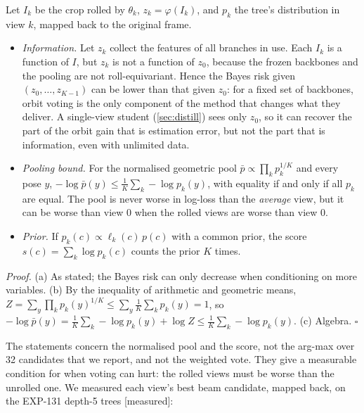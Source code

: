 \begin{proposition}\label{prop:orbit}
Let $I_k$ be the crop rolled by $\theta_k$, $z_k=\varphi(I_k)$, and $p_k$ the tree's distribution in view $k$, mapped back to the
original frame.
\begin{itemize}
\item[(a)] \emph{Information.} Let $z_k$ collect the features of all branches in use. Each $I_k$ is a function of $I$, but $z_k$ is
not a function of $z_0$, because the frozen backbones and the pooling are not roll-equivariant. Hence the Bayes risk given
$(z_0,\dots,z_{K-1})$ can be lower than that given $z_0$: for a fixed set of backbones, orbit voting is the only component of the
method that changes what they deliver. A single-view student
(\cref{sec:distill}) sees only $z_0$, so it can recover the part of the orbit gain that is estimation error, but not the part that
is information, even with unlimited data.
\item[(b)] \emph{Pooling bound.} For the normalised geometric pool $\bar p\propto\prod_kp_k^{1/K}$ and every pose $y$,
$-\log\bar p(y)\le\frac1K\sum_k-\log p_k(y)$, with equality if and only if all $p_k$ are equal. The pool is never worse in log-loss
than the \emph{average} view, but it can be worse than view 0 when the rolled views are worse than view 0.
\item[(c)] \emph{Prior.} If $p_k(c)\propto\ell_k(c)\,p(c)$ with a common prior, the score $s(c)=\sum_k\log p_k(c)$ counts the prior $K$ times.
\end{itemize}
\end{proposition}
\noindent\emph{Proof.} (a) As stated; the Bayes risk can only decrease when conditioning on more variables. (b) By the
inequality of arithmetic and geometric means, $Z=\sum_y\prod_kp_k(y)^{1/K}\le\sum_y\frac1K\sum_kp_k(y)=1$, so
$-\log\bar p(y)=\frac1K\sum_k-\log p_k(y)+\log Z\le\frac1K\sum_k-\log p_k(y)$. (c) Algebra. \hfill$\square$

\noindent The statements concern the normalised pool and the score, not the arg-max over 32 candidates that we report, and
not the weighted vote. They give a measurable condition for when voting can hurt: the rolled views must be worse than the
unrolled one. We measured each view's best beam candidate, mapped back, on the EXP-131 depth-5 trees [measured]:

